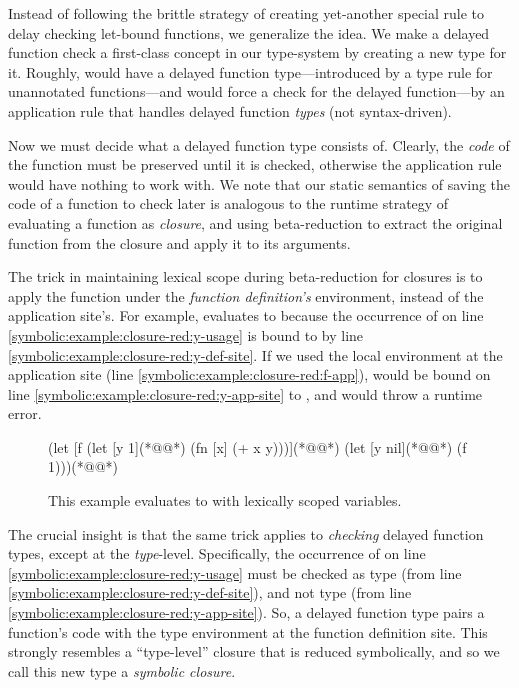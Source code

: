 Instead of following the brittle strategy of creating yet-another special rule to delay checking
let-bound functions, we generalize the idea.
We make a delayed function check a first-class concept in our type-system by
creating a new type for it.
Roughly,  would have a delayed function type---introduced by
a type rule for unannotated functions---and 
would force a check for the delayed function---by an application
rule that handles delayed function \emph{types} (not syntax-driven).

Now we must decide what a delayed function type consists of.
Clearly, the \emph{code} of the function must be preserved until
it is checked, otherwise the application rule would have nothing
to work with.
We note that our static semantics of saving
the code of a function to check later
is analogous to the runtime strategy of
evaluating a function as \emph{closure},
and using beta-reduction to extract the original
function from the closure and apply it to its arguments.

The trick in maintaining lexical scope during beta-reduction for closures
is to apply the function under the \emph{function definition's}
environment, instead of the application site's.
For example,
evaluates
to 
because
the occurrence of
 on line \ref{symbolic:example:closure-red:y-usage}
is bound to  by line \ref{symbolic:example:closure-red:y-def-site}.
If we used the local environment at the application site (line \ref{symbolic:example:closure-red:f-app}),
 would be bound on line \ref{symbolic:example:closure-red:y-app-site}
to ,
and would throw a runtime error.

\begin{figure}
{
\lstset{numbers=left}
\begin{cljlisting}
(let [f (let [y 1](*@\label{symbolic:example:closure-red:y-def-site}@*)
          (fn [x] (+ x y)))](*@\label{symbolic:example:closure-red:y-usage}@*)
  (let [y nil](*@\label{symbolic:example:closure-red:y-app-site}@*)
    (f 1)))(*@\label{symbolic:example:closure-red:f-app}@*)
\end{cljlisting}
}
  \caption{This example evaluates to  with lexically scoped variables.}
  \label{symbolic:example:closure-red}
\end{figure}

The crucial insight is that
the same trick applies to \emph{checking} delayed function types,
except at the \emph{type}-level.
Specifically, the occurrence of 
on line \ref{symbolic:example:closure-red:y-usage}
must be checked as type  (from line \ref{symbolic:example:closure-red:y-def-site}),
and not type  (from line \ref{symbolic:example:closure-red:y-app-site}).
So, a delayed function type pairs a function's code with the type environment
at the function definition site.
This strongly resembles a ``type-level'' closure that is reduced symbolically,
and so we call this new type a \emph{symbolic closure}.

